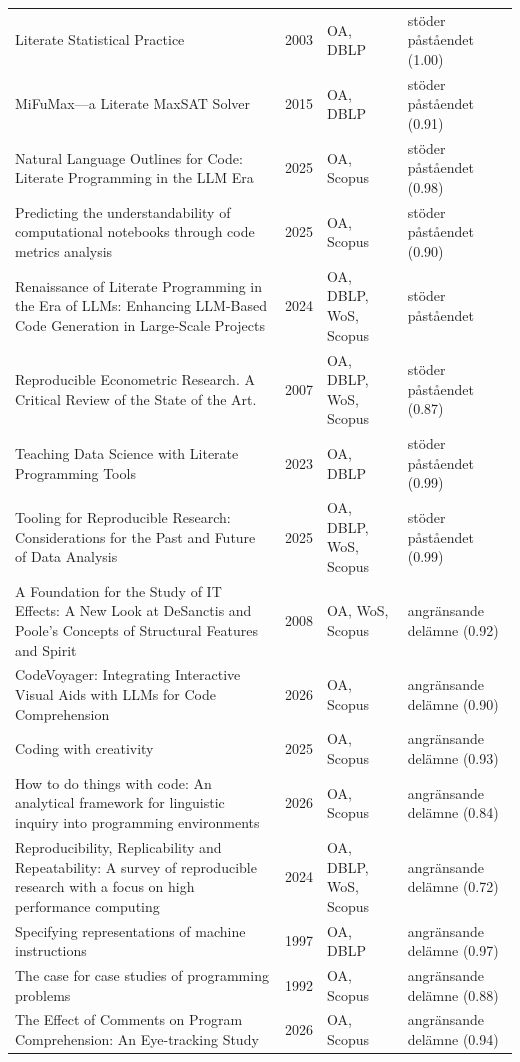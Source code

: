 \begin{longtable}{@{}%
  >{\raggedright\arraybackslash}p{}c%
  >{\raggedright\arraybackslash}p{}%
  >{\raggedright\arraybackslash}p{}@{}}
Literate Statistical Practice & 2003 & OA, DBLP & stöder påståendet (1.00) \\
MiFuMax---a Literate MaxSAT Solver & 2015 & OA, DBLP & stöder påståendet (0.91) \\
Natural Language Outlines for Code: Literate Programming in the LLM Era & 2025 & OA, Scopus & stöder påståendet (0.98) \\
Predicting the understandability of computational notebooks through code metrics analysis & 2025 & OA, Scopus & stöder påståendet (0.90) \\
Renaissance of Literate Programming in the Era of LLMs: Enhancing LLM-Based Code Generation in Large-Scale Projects & 2024 & OA, DBLP, WoS, Scopus & stöder påståendet \\
Reproducible Econometric Research. A Critical Review of the State of the Art. & 2007 & OA, DBLP, WoS, Scopus & stöder påståendet (0.87) \\
Teaching Data Science with Literate Programming Tools & 2023 & OA, DBLP & stöder påståendet (0.99) \\
Tooling for Reproducible Research: Considerations for the Past and Future of Data Analysis & 2025 & OA, DBLP, WoS, Scopus & stöder påståendet (0.99) \\
A Foundation for the Study of IT Effects: A New Look at DeSanctis and Poole's Concepts of Structural Features and Spirit & 2008 & OA, WoS, Scopus & angränsande delämne (0.92) \\
CodeVoyager: Integrating Interactive Visual Aids with LLMs for Code Comprehension & 2026 & OA, Scopus & angränsande delämne (0.90) \\
Coding with creativity & 2025 & OA, Scopus & angränsande delämne (0.93) \\
How to do things with code: An analytical framework for linguistic inquiry into programming environments & 2026 & OA, Scopus & angränsande delämne (0.84) \\
Reproducibility, Replicability and Repeatability: A survey of reproducible research with a focus on high performance computing & 2024 & OA, DBLP, WoS, Scopus & angränsande delämne (0.72) \\
Specifying representations of machine instructions & 1997 & OA, DBLP & angränsande delämne (0.97) \\
The case for case studies of programming problems & 1992 & OA, Scopus & angränsande delämne (0.88) \\
The Effect of Comments on Program Comprehension: An Eye-tracking Study & 2026 & OA, Scopus & angränsande delämne (0.94) \\

\end{longtable}
